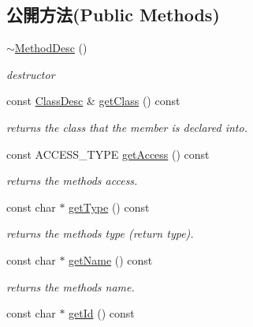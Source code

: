 \subsection*{公開方法(Public Methods)}
\begin{DoxyCompactItemize}
\item 
\hyperlink{classagm_1_1reflection_1_1_method_desc_a5f7e3fceb563a4352be08f6b444c5359}{$\sim$\+Method\+Desc} ()\hypertarget{classagm_1_1reflection_1_1_method_desc_a5f7e3fceb563a4352be08f6b444c5359}{}\label{classagm_1_1reflection_1_1_method_desc_a5f7e3fceb563a4352be08f6b444c5359}

\begin{DoxyCompactList}\small\item\em destructor \end{DoxyCompactList}\item 
const \hyperlink{classagm_1_1reflection_1_1_class_desc}{Class\+Desc} \& \hyperlink{classagm_1_1reflection_1_1_method_desc_a205ca3b9cd08e85c557bb54438d3bf92}{get\+Class} () const 
\begin{DoxyCompactList}\small\item\em returns the class that the member is declared into. \end{DoxyCompactList}\item 
const A\+C\+C\+E\+S\+S\+\_\+\+T\+Y\+PE \hyperlink{classagm_1_1reflection_1_1_method_desc_ac52cb29de4e8dba4833f052dc88f136f}{get\+Access} () const 
\begin{DoxyCompactList}\small\item\em returns the method\textquotesingle{}s access. \end{DoxyCompactList}\item 
const char $\ast$ \hyperlink{classagm_1_1reflection_1_1_method_desc_a2dc69fd8feb410be5f4489acc102a9a0}{get\+Type} () const 
\begin{DoxyCompactList}\small\item\em returns the method\textquotesingle{}s type (return type). \end{DoxyCompactList}\item 
const char $\ast$ \hyperlink{classagm_1_1reflection_1_1_method_desc_a85533cb0a86c116aa7d6bc3d56858929}{get\+Name} () const 
\begin{DoxyCompactList}\small\item\em returns the method\textquotesingle{}s name. \end{DoxyCompactList}\item 
const char $\ast$ \hyperlink{classagm_1_1reflection_1_1_method_desc_a0b366083d02cb631c838daec5a53cd1b}{get\+Id} () const 

\end{DoxyCompactItemize}
